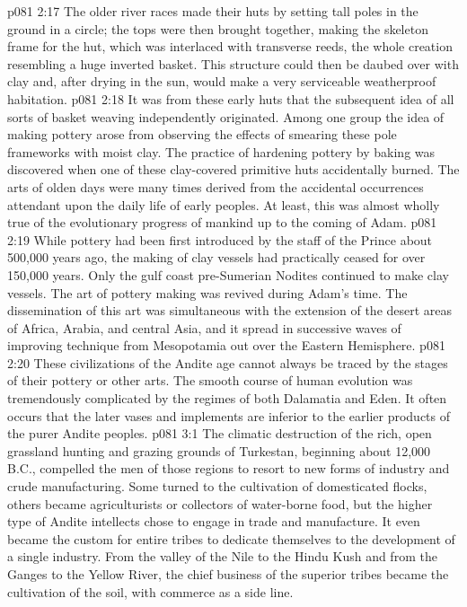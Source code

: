 \vs p081 2:17 The older river races made their huts by setting tall poles in the ground in a circle; the tops were then brought together, making the skeleton frame for the hut, which was interlaced with transverse reeds, the whole creation resembling a huge inverted basket. This structure could then be daubed over with clay and, after drying in the sun, would make a very serviceable weatherproof habitation.
\vs p081 2:18 It was from these early huts that the subsequent idea of all sorts of basket weaving independently originated. Among one group the idea of making pottery arose from observing the effects of smearing these pole frameworks with moist clay. The practice of hardening pottery by baking was discovered when one of these clay\hyp{}covered primitive huts accidentally burned. The arts of olden days were many times derived from the accidental occurrences attendant upon the daily life of early peoples. At least, this was almost wholly true of the evolutionary progress of mankind up to the coming of Adam.
\vs p081 2:19 While pottery had been first introduced by the staff of the Prince about 500,000 years ago, the making of clay vessels had practically ceased for over 150,000 years. Only the gulf coast pre\hyp{}Sumerian Nodites continued to make clay vessels. The art of pottery making was revived during Adam’s time. The dissemination of this art was simultaneous with the extension of the desert areas of Africa, Arabia, and central Asia, and it spread in successive waves of improving technique from Mesopotamia out over the Eastern Hemisphere.
\vs p081 2:20 These civilizations of the Andite age cannot always be traced by the stages of their pottery or other arts. The smooth course of human evolution was tremendously complicated by the regimes of both Dalamatia and Eden. It often occurs that the later vases and implements are inferior to the earlier products of the purer Andite peoples.
\vs p081 3:1 The climatic destruction of the rich, open grassland hunting and grazing grounds of Turkestan, beginning about 12,000\,B.C., compelled the men of those regions to resort to new forms of industry and crude manufacturing. Some turned to the cultivation of domesticated flocks, others became agriculturists or collectors of water\hyp{}borne food, but the higher type of Andite intellects chose to engage in trade and manufacture. It even became the custom for entire tribes to dedicate themselves to the development of a single industry. From the valley of the Nile to the Hindu Kush and from the Ganges to the Yellow River, the chief business of the superior tribes became the cultivation of the soil, with commerce as a side line.
